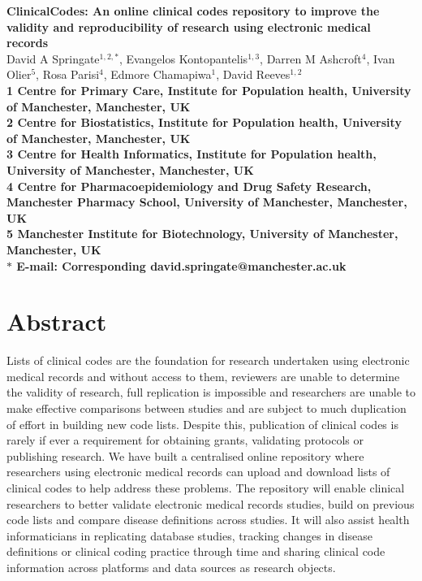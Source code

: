 \documentclass[10pt]{article}
\date{}
\begin{document}
\begin{flushleft}
{\Large
\textbf{ClinicalCodes: An online clinical codes repository to improve the validity and reproducibility of research using electronic medical records}
}
\\
David A Springate$^{1,2,\ast}$, 
Evangelos Kontopantelis$^{1,3}$,
Darren M Ashcroft$^{4}$,
Ivan Olier$^{5}$,
Rosa Parisi$^{4}$,
Edmore Chamapiwa$^{1}$,
David Reeves$^{1,2}$
\\
\bf{1} Centre for Primary Care, Institute for Population health, University of Manchester, Manchester, UK
\\
\bf{2} Centre for Biostatistics, Institute for Population health, University of Manchester, Manchester, UK
\\
\bf{3} Centre for Health Informatics, Institute for Population health, University of Manchester, Manchester, UK
\\
\bf{4} Centre for Pharmacoepidemiology and Drug Safety Research, Manchester Pharmacy School, University of Manchester, Manchester, UK
\\
\bf{5} Manchester Institute for Biotechnology, University of Manchester, Manchester, UK
\\
$\ast$ E-mail: Corresponding david.springate@manchester.ac.uk
\end{flushleft}

\section*{Abstract}

Lists of clinical codes are the foundation for research undertaken using electronic medical records and without access to them, reviewers are unable to determine the validity of research, full replication is impossible and researchers are unable to make effective comparisons between studies and are subject to much duplication of effort in building new code lists.  Despite this, publication of clinical codes is rarely if ever a requirement for obtaining grants, validating protocols or publishing research.  We have built a centralised online repository where researchers using electronic medical records can upload and download lists of clinical codes to help address these problems.  The repository will enable clinical researchers to better validate electronic medical records studies, build on previous code lists and compare disease definitions across studies.  It will also assist health informaticians in replicating database studies, tracking changes in disease definitions or clinical coding practice through time and sharing clinical code information across platforms and data sources as research objects. 
\end{document}
